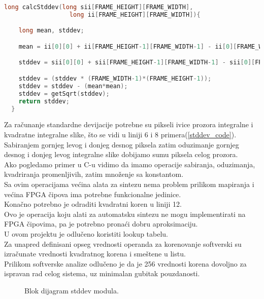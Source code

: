 \begin{lstlisting}[language=C++,caption={Primer računanja standardne devijacije u \textbf{C}-u},captionpos=b, label=stddev_code]
  long calcStddev(long sii[FRAME_HEIGHT][FRAME_WIDTH],
                  long ii[FRAME_HEIGHT][FRAME_WIDTH]){

    long mean, stddev;

    mean = ii[0][0] + ii[FRAME_HEIGHT-1][FRAME_WIDTH-1] - ii[0][FRAME_WIDTH-1] - ii[FRAME_HEIGHT-1][0];

    stddev = sii[0][0] + sii[FRAME_HEIGHT-1][FRAME_WIDTH-1] - sii[0][FRAME_WIDTH-1] - sii[FRAME_HEIGHT-1][0];

    stddev = (stddev * (FRAME_WIDTH-1)*(FRAME_HEIGHT-1));
    stddev = stddev - (mean*mean);
    stddev = getSqrt(stddev);
    return stddev;
  }
\end{lstlisting}

Za računanje standardne devijacije potrebne su pikseli ivice prozora integralne i
kvadratne integralne slike, što se vidi u liniji 6 i 8
primera(\ref{stddev_code}). \\
Sabiranjem gornjeg levog i donjeg desnog piksela zatim oduzimanje gornjeg desnog
i donjeg levog integralne slike dobijamo sumu piksela celog prozora. \\
Ako pogledamo primer u C-u vidimo da imamo operacije sabiranja, oduzimanja,
kvadriranja promenljivih, zatim množenje sa konstantom. \\
Sa ovim operacijama većina alata za sintezu nema problem prilikom mapiranja i
većina FPGA čipova ima potrebne funkcionalne jedinice. \\

Konačno potrebno je odraditi kvadratni koren u liniji 12. \\
Ovo je operacija koju alati za automatsku sintezu ne mogu implementirati
na FPGA čipovima, pa je potrebno pronaći dobru aproksimaciju. \\

U ovom projektu je odlučeno koristiti lookup tabelu. \\
Za unapred definisani opseg vrednosti operanda za korenovanje softverski su
izračunate vrednosti kvadratnog korena i smeštene u listu. \\
Prilikom softverske analize odlučeno je da je 256 vrednosti korena dovoljno za ispravan
rad celog sistema, uz minimalan gubitak pouzdanosti. \\

\begin{figure}[H]
  \centering
  \resizebox{1\textwidth}{!}{%
    
    }
\caption{Blok dijagram stddev modula.}
\label{stddev_bd}
\end{figure}

